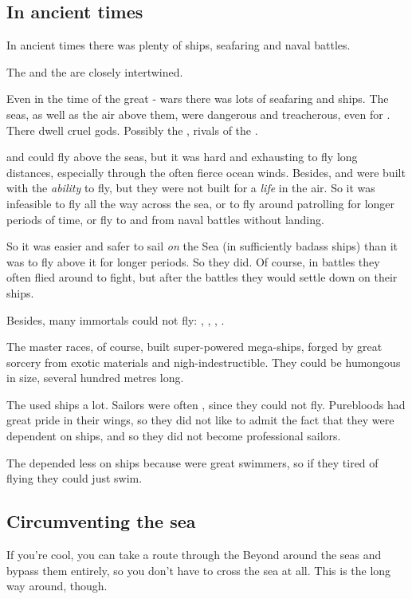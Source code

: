 \subsection{In ancient times}
In ancient times there was plenty of ships, seafaring and naval battles. 

The  and the  are closely intertwined.

Even in the time of the great \dragon-\resphan{} wars there was lots of seafaring and ships. 
The seas, as well as the air above them, were dangerous and treacherous, even for \dragons. 
There dwell cruel gods. 
Possibly the , rivals of the .

\Dragons{} and \resphain{} could fly above the seas, but it was hard and exhausting to fly long distances, especially through the often fierce ocean winds. 
Besides, \dragons{} and \resphain{} were built with the \emph{ability} to fly, but they were not built for a \emph{life} in the air. 
So it was infeasible to fly all the way across the sea, or to fly around patrolling for longer periods of time, or fly to and from naval battles without landing. 

So it was easier and safer to sail \emph{on} the Sea (in sufficiently badass ships) than it was to fly above it for longer periods. 
So they did. 
Of course, in battles they often flied around to fight, but after the battles they would settle down on their ships. 

Besides, many immortals could not fly: 
\QuilJaaran, \aryothim, \vorcanths, \bezedeth. 

The master races, of course, built super-powered mega-ships, forged by great sorcery from exotic materials and nigh-indestructible. They could be humongous in size, several hundred metres long. 

The \resphain used ships a lot.
Sailors were often \bezedeth, since they could not fly.
Purebloods had great pride in their wings, so they did not like to admit the fact that they were dependent on ships, and so they did not become professional sailors.

The \dragons depended less on ships because \dragons were great swimmers, so if they tired of flying they could just swim.







\subsection{Circumventing the sea}
If you're cool, you can take a route through the Beyond around the seas and bypass them entirely, so you don't have to cross the sea at all. 
This is the long way around, though. 

